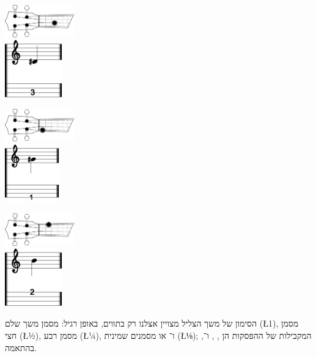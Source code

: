 \vspace{\baselineskip}
\begin{minipage}{4cm}
	\centering
	\includegraphics[width=3cm]{plano-C3.eps}\\
	\includegraphics[height=2.5cm]{tab-C3.eps}
\end{minipage}\hfill
\begin{minipage}{4cm}
	\centering
	\includegraphics[width=3cm]{plano-G1.eps}\\
	\includegraphics[height=2.5cm]{tab-G1.eps}
\end{minipage}\hfill
\begin{minipage}{4cm}
	\centering
	\includegraphics[width=3cm]{plano-A2.eps}\\
	\includegraphics[height=2.5cm]{tab-A2.eps}
\end{minipage}
\vspace{\baselineskip}

הסימון של משך הצליל מצויין אצלנו רק בתווים, באופן רגיל:  מסמן משך שלם (\L{1}),  מסמן חצי (\L{½}),  מסמן רבע (\L{¼}), ו־ או  מסמנים שמינית (\L{⅛}); המקבילות של ההפסקות הן , ,  ו־, בהתאמה.


